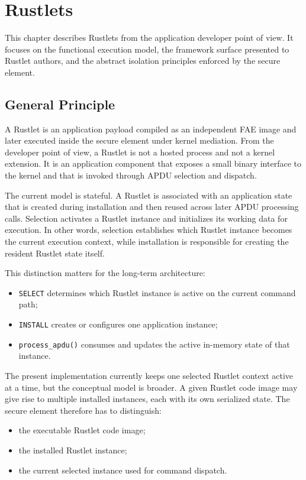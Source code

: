 \chapter{Rustlets}

This chapter describes Rustlets from the application developer point of
view. It focuses on the functional execution model, the framework
surface presented to Rustlet authors, and the abstract isolation
principles enforced by the secure element.

\section{General Principle}

A Rustlet is an application payload compiled as an independent FAE image
and later executed inside the secure element under kernel mediation.
From the developer point of view, a Rustlet is not a hosted process and
not a kernel extension. It is an application component that exposes a
small binary interface to the kernel and that is invoked through APDU
selection and dispatch.

The current model is stateful. A Rustlet is associated with an
application state that is created during installation and then reused
across later APDU processing calls. Selection activates a Rustlet
instance and initializes its working data for execution. In other words,
selection establishes which Rustlet instance becomes the current
execution context, while installation is responsible for creating the
resident Rustlet state itself.

This distinction matters for the long-term architecture:
\begin{itemize}
\item \texttt{SELECT} determines which Rustlet instance is active on the
  current command path;
\item \texttt{INSTALL} creates or configures one application instance;
\item \texttt{process\_apdu()} consumes and updates the active
  in-memory state of that instance.
\end{itemize}

The present implementation currently keeps one selected Rustlet context
active at a time, but the conceptual model is broader. A given Rustlet
code image may give rise to multiple installed instances, each with its
own serialized state. The secure element therefore has to distinguish:
\begin{itemize}
\item the executable Rustlet code image;
\item the installed Rustlet instance;
\item the current selected instance used for command dispatch.
\end{itemize}

